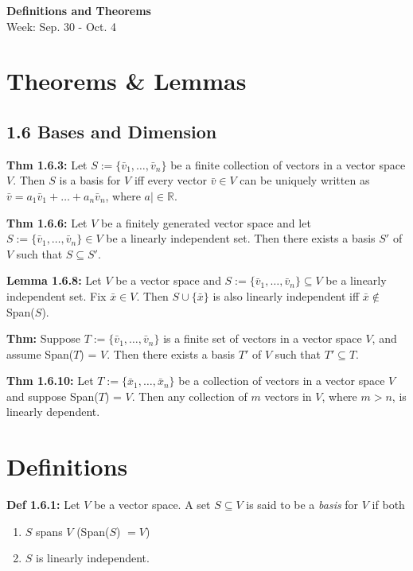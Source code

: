 \noindent
\textbf{\LARGE Definitions and Theorems} \\
\large Week: Sep. 30 - Oct. 4

\normalsize

\section*{Theorems \& Lemmas}

\subsection*{1.6 Bases and Dimension}

\textbf{Thm 1.6.3:} Let $S := \{\bar v_1, \ldots , \bar v_n \}$ be a finite collection of vectors in a vector space $V$. Then $S$ is a basis for $V$ iff every vector $\bar v \in V$ can be uniquely written as $\bar v = a_1 \bar v_1 + \ldots + a_n \bar v_n$, where $a \mid \in \mathbb{R}$.

\bigskip

\noindent
\textbf{Thm 1.6.6:} Let $V$ be a finitely generated vector space and let $S := \{\bar v_1, \ldots , \bar v_n \} \in V$ be a linearly independent set. Then there exists a basis $S'$ of $V$ such that $S \subseteq S'$.

\bigskip

\noindent
\textbf{Lemma 1.6.8:} Let $V$ be a vector space and $S := \{\bar v_1 , \ldots , \bar v_n \} \subseteq V$ be a linearly independent set. Fix $\bar x \in V$. Then $S \cup \{\bar x\}$ is also linearly independent iff $\bar x \notin$ Span($S$).

\bigskip 

\noindent 
\textbf{Thm:} Suppose $T := \{\bar v_1, \ldots , \bar v_n \}$ is a finite set of vectors in a vector space $V$, and assume Span($T$) = $V$. Then there exists a basis $T'$ of $V$ such that $T' \subseteq T$.

\bigskip 

\noindent 
\textbf{Thm 1.6.10:} Let $T := \{\bar x_1, \ldots , \bar x_n \}$ be a collection of vectors in a vector space $V$ and suppose Span($T$) = $V$. Then any collection of $m$ vectors in $V$, where $m > n$, is linearly dependent. 

\section*{Definitions}

\textbf{Def 1.6.1:} Let $V$ be a vector space. A set $S \subseteq V$ is said to be a \textit{basis} for $V$ if both 
\begin{enumerate}
    \item $S$ spans $V$ (Span($S$) $= V$) 
    \item $S$ is linearly independent.
\end{enumerate}